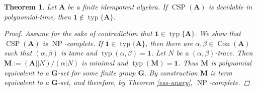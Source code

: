 \documentclass{amsart}
\theoremstyle{plain}
\newtheorem{theorem}{Theorem}[section]
\theoremstyle{definition}
\theoremstyle{remark}
\DeclareMathOperator{\Con}{Con}
\DeclareMathOperator{\CSP}{CSP}
\DeclareMathOperator{\NP}{NP}
\DeclareMathOperator{\typ}{typ}
\begin{document}
\begin{theorem}
    Let $\mathbf{A}$ be a finite idempotent algebra. 
    If $\CSP(\mathbf{A})$ is decidable in polynomial-time, then $\mathbf{1} \notin \typ\{\mathbf{A}\}$.  
    \begin{proof}
        Assume for the sake of contradiction that $\mathbf{1} \in \typ\{\mathbf{A}\}$. 
        We show that $\CSP(\mathbf{A})$ is $\NP$-complete. 
        If $\mathbf{1} \in \typ\{\mathbf{A}\}$, then there are $\alpha, \beta \in \Con(\mathbf{A})$ such that $(\alpha, \beta)$ is tame and $\typ(\alpha, \beta) = \mathbf{1}$.
        Let $N$ be a $(\alpha,\beta)$-trace.
        Then $\mathbf{M}:=(\mathbf{A}||N)/(\alpha|N)$ is minimal and $\typ(\mathbf{M})=\mathbf{1}$. 
        Thus $\mathbf{M}$ is polynomial equivalent to a $\mathbf{G}$-set for some finite group $\mathbf{G}$. 
        By construction $\mathbf{M}$ is term equivalent to a $\mathbf{G}$-set, and therefore, by Theorem \ref{ess-unary}, $\NP$-complete.  
        

\end{proof}
\end{theorem}
\end{document}
